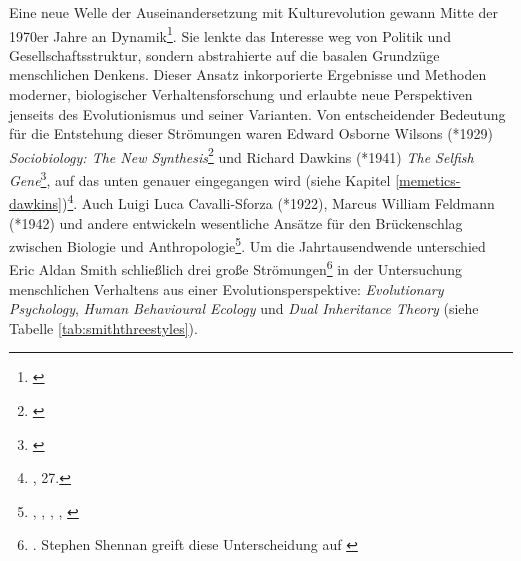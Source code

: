 \documentclass[openany,twoside,twocolumn]{book}
\let\rmarkdownfootnote\footnote%
\def\footnote{\protect\rmarkdownfootnote}
\begin{document}
Eine neue Welle der Auseinandersetzung mit Kulturevolution gewann Mitte
der 1970er Jahre an Dynamik\footnote{\textcite{creanza_cultural_2017}}.
Sie lenkte das Interesse weg von Politik und Gesellschaftsstruktur,
sondern abstrahierte auf die basalen Grundzüge menschlichen Denkens.
Dieser Ansatz inkorporierte Ergebnisse und Methoden moderner,
biologischer Verhaltensforschung und erlaubte neue Perspektiven jenseits
des Evolutionismus und seiner Varianten. Von entscheidender Bedeutung
für die Entstehung dieser Strömungen waren Edward Osborne Wilsons
(*1929) \emph{Sociobiology: The New Synthesis}\footnote{\textcite{WilsonSociobiologynewsynthesis1975}}
und Richard Dawkins (*1941) \emph{The Selfish Gene}\footnote{\textcite{Dawkinsselfishgene1976}},
auf das unten genauer eingegangen wird (siehe Kapitel
\ref{memetics-dawkins})\footnote{\textcite{SmithThreestylesevolutionary2000},
  27.}. Auch Luigi Luca Cavalli-Sforza (*1922), Marcus William Feldmann
(*1942) und andere entwickeln wesentliche Ansätze für den Brückenschlag
zwischen Biologie und Anthropologie\footnote{\textcite{alland_cultural_1972},
  \textcite{cavalli-sforza_models_1973}, \textcite{feldman_models_1975},
  \textcite{feldman_cultural_1976}, \textcite{blum_uncertainty_1978}}.
Um die Jahrtausendwende unterschied Eric Aldan Smith schließlich drei
große Strömungen\footnote{\textcite{SmithThreestylesevolutionary2000}.
  Stephen Shennan greift diese Unterscheidung auf
  \autocite[15-18.]{ShennanGenesmemeshuman2002}} in der Untersuchung
menschlichen Verhaltens aus einer Evolutionsperspektive:
\emph{Evolutionary Psychology}, \emph{Human Behavioural Ecology} und
\emph{Dual Inheritance Theory} (siehe Tabelle
\ref{tab:smiththreestyles}).
\end{document}
